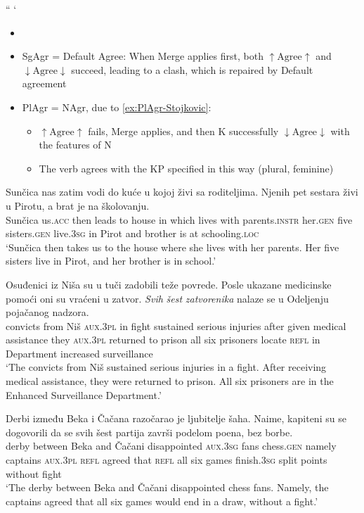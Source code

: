 ``
`

\begin{itemize}
    \item
    \bigbreak
    \item SgAgr = Default Agree: When Merge applies first, both \(\uparrow \text{Agree} \uparrow\) and \(\downarrow \text{Agree} \downarrow\) succeed, leading to a clash, which is repaired by Default agreement
    \bigbreak
    \item PlAgr = NAgr, due to \ref{ex:PlAgr-Stojkovic}: 
    \begin{itemize}
        \item \(\uparrow \text{Agree} \uparrow\) fails, Merge applies, and then K successfully \(\downarrow \text{Agree} \downarrow\) with the features of N
        \item The verb agrees with the KP specified in this way (plural, feminine)
    \end{itemize}
\end{itemize}

\ea
\gll Sunčica nas zatim vodi do kuće u kojoj živi sa roditeljima. Njenih pet sestara živi u Pirotu, a brat je na školovanju.\\
      Sunčica us.\textsc{acc} then leads to house in which lives with parents.\textsc{instr} her.\textsc{gen} five sisters.\textsc{gen} live.\textsc{3sg} in Pirot and brother is at schooling.\textsc{loc}\\
\glt `Sunčica then takes us to the house where she lives with her parents. Her five sisters live in Pirot, and her brother is in school.'
\z

\ea 
\gll Osuđenici iz Niša su u tuči zadobili teže povrede. Posle ukazane medicinske pomoći oni su vraćeni u zatvor. \textit{Svih} \textit{šest} \textit{zatvorenika} nalaze se u Odeljenju pojačanog nadzora.\\
      convicts from Niš \textsc{aux}.3\textsc{pl} in fight sustained serious injuries after given medical assistance they \textsc{aux}.3\textsc{pl} returned to prison all six prisoners locate \textsc{refl} in Department increased surveillance\\
\glt `The convicts from Niš sustained serious injuries in a fight. After receiving medical assistance, they were returned to prison. All six prisoners are in the Enhanced Surveillance Department.'
\z

\ea 
\gll Derbi između Beka i Čačana razočarao je ljubitelje šaha. Naime, kapiteni su se dogovorili da se svih šest partija završi podelom poena, bez borbe.\\
      derby between Beka and Čačani disappointed \textsc{aux}.3\textsc{sg} fans chess.\textsc{gen} namely captains \textsc{aux}.3\textsc{pl} \textsc{refl} agreed that \textsc{refl} all six games finish.\textsc{3sg} split points without fight\\
\glt `The derby between Beka and Čačani disappointed chess fans. Namely, the captains agreed that all six games would end in a draw, without a fight.'
\z

